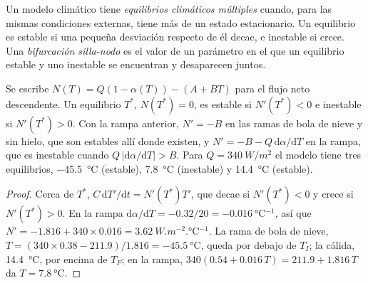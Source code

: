 \begin{definition}\label{def:b3:climate-models:multiple-equilibria}
Un modelo climático tiene \emph{equilibrios climáticos múltiples}
cuando, para las mismas condiciones externas, tiene más
de un estado estacionario. Un equilibrio es estable si una pequeña desviación respecto
de él decae, e inestable si crece. Una \emph{bifurcación
silla-nodo} es el valor de un parámetro en el que
un equilibrio estable y uno inestable se encuentran y desaparecen juntos.
\end{definition}

\begin{proposition}\label{prop:b3:climate-models:three}
Se escribe $N(T) = Q(1 - \alpha(T)) - (A + BT)$ para el flujo neto descendente. Un
equilibrio $T^*$, $N(T^*) = 0$, es estable si $N'(T^*) < 0$ e inestable si
$N'(T^*) > 0$. Con la rampa anterior, $N' = -B$ en las ramas de bola de nieve y
sin hielo, que son estables allí donde existen, y $N' = -B -
Q\,\mathrm d\alpha/\mathrm dT$ en la rampa, que es inestable cuando $Q\,
|\mathrm d\alpha/\mathrm dT| > B$. Para $Q = \qty{340}{W/m^2}$ el modelo tiene
tres equilibrios, \qty{-45.5}{\celsius} (estable), \qty{7.8}{\celsius}
(inestable) y \qty{14.4}{\celsius} (estable).
\end{proposition}

\begin{proof}
Cerca de $T^*$, $C\,\mathrm dT'/\mathrm dt = N'(T^*)T'$, que decae si
$N'(T^*) < 0$ y crece si $N'(T^*) > 0$. En la rampa $\mathrm d\alpha/
\mathrm dT = -0.32/20 = \qty{-0.016}{\celsius^{-1}}$, así que $N' = -1.816 + 340
\times 0.016 = \qty{+3.62}{W.m^{-2}.\celsius^{-1}}$. La rama de bola de nieve,
$T = (340\times0.38 - 211.9)/1.816 = \qty{-45.5}{\celsius}$, queda por debajo de
$T_I$; la cálida, \qty{14.4}{\celsius}, por encima de $T_F$; en la rampa,
$340(0.54 + 0.016\,T) = 211.9 + 1.816\,T$ da $T = \qty{7.8}{\celsius}$.
\end{proof}

